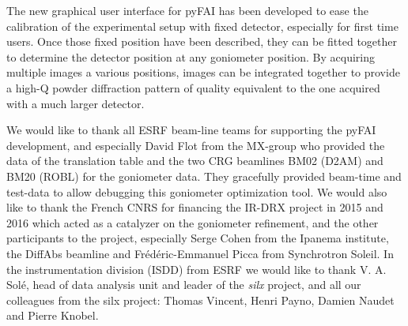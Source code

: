 \documentclass[preprint, pdf]{iucr}              %
\begin{document}
The new graphical user interface for pyFAI has been developed to ease the
calibration of the experimental setup with fixed detector, especially for first
time users.
Once those fixed position have been described, they can be fitted together to
determine the detector position at any goniometer position. 
By acquiring multiple images a various positions, images can be
integrated together to provide a high-Q powder diffraction pattern of
quality equivalent to the one acquired with a much larger detector. 

 

We would like to thank all ESRF beam-line teams for supporting the
pyFAI development, and especially David Flot from the MX-group who provided the
data of the translation table and the two CRG beamlines BM02 (D2AM) and BM20
(ROBL) for the goniometer data. 
They gracefully provided beam-time and test-data to allow debugging this 
goniometer optimization tool.
We would also like to thank the French CNRS for financing the IR-DRX project
in 2015 and 2016 which acted as a catalyzer on the goniometer refinement,
and the other participants to the project, especially Serge Cohen from the
Ipanema institute, the DiffAbs beamline and Frédéric-Emmanuel Picca from
Synchrotron Soleil.
In the instrumentation division (ISDD) from ESRF  we would like to thank V. A.
Solé, head of data analysis unit and leader of the \textit{silx} project, and all our
colleagues from the silx project: Thomas Vincent, Henri Payno, Damien Naudet and
Pierre Knobel.



\end{document}
